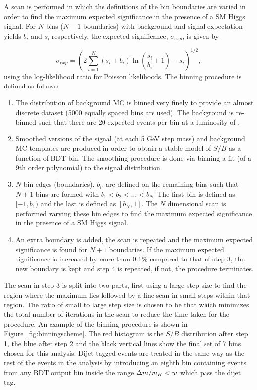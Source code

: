 A scan is performed in which the definitions of the bin boundaries are varied in order to
find the maximum expected significance in the presence of a SM Higgs signal. For $N$ bins 
($N-1$ boundaries) with background and signal expectation yields $b_{i}$ and $s_{i}$ respectively,
the expected significance, $\sigma_{exp}$, is given by

\begin{equation}
 \sigma_{exp} = \left( 2 \sum_{i=1}^{N} (s_{i}+b_{i})\ln\left(\frac{\displaystyle s_{i}}{\displaystyle b_{i}} +1\right) - s_{i} \right)^{1/2},
\label{eqn:expectedsig_bins}
\end{equation}
using the log-likelihood ratio for Poisson likelihoods.
The binning procedure is defined as follows:

\begin{enumerate}

\item The distribution of background MC is binned very finely to provide an almost discrete
dataset (5000 equally spaced bins are used). The background is re-binned such that there are 20
expected events per bin at a luminosity of \clumi. 
\item Smoothed versions of the signal (at each 5 GeV step mass) and background MC templates are produced 
in order to obtain a stable model of $S/B$ as a function of BDT bin.
The smoothing procedure is done via binning a fit (of a 9th order polynomial) to the signal
distribution.
\item $N$ bin edges (boundaries), $b_{i}$, are defined on the remaining bins such that $N+1$ bins 
are formed with $b_{1} < b_{2} < \ldots < b_{N}$. The first bin is defined as $[-1,b_{1})$ and the last
is defined as $[b_{N},1]$. The $N$ dimensional scan is performed varying these
bin edges to find the maximum expected significance in the presence of a SM Higgs signal. 
\item An extra boundary is added, the scan is repeated and the maximum expected
significance is found for $N+1$ boundaries. If the maximum expected significance  
is increased by more than 0.1\% compared to that of step 3, the new boundary is kept and step 4 
is repeated, if not, the procedure terminates.
\end{enumerate}

The scan in step 3 is split into two parts, first using a large step size to find the 
region where the maximum lies followed by a fine scan in small steps within that region. 
The ratio of small to large step size is chosen to be that
which minimizes the total number of iterations in the scan to reduce the time taken for the procedure.
An example of the binning procedure is shown in Figure~\ref{fig:binningscheme}. 
The red histogram is the $S/B$ distribution after step 1, the 
blue after step 2 and the black vertical lines show the final set of 7 bins chosen for this analysis.
Dijet tagged events are treated in the same way as the rest of the events in the analysis 
by introducing an eighth bin containing events from any BDT output bin inside the range $\Delta m/m_{H} < w$ 
which pass the dijet tag.


